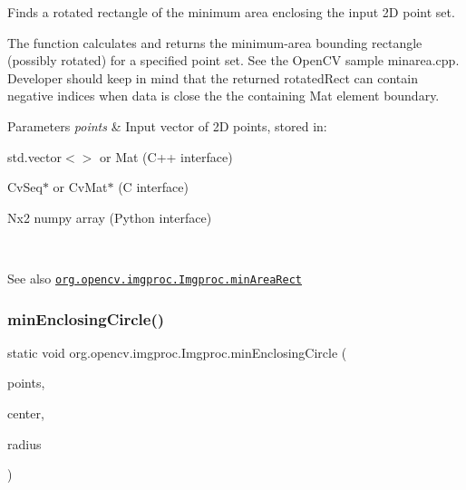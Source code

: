 Finds a rotated rectangle of the minimum area enclosing the input 2D point set.

The function calculates and returns the minimum-\/area bounding rectangle (possibly rotated) for a specified point set. See the Open\+CV sample {\ttfamily minarea.\+cpp}. Developer should keep in mind that the returned rotated\+Rect can contain negative indices when data is close the the containing Mat element boundary.


\begin{DoxyParams}{Parameters}
{\em points} & Input vector of 2D points, stored in\+: 
\begin{DoxyItemize}
\item {\ttfamily std.\+vector$<$$>$} or {\ttfamily Mat} (C++ interface) 
\item {\ttfamily Cv\+Seq$\ast$} or {\ttfamily Cv\+Mat$\ast$} (C interface) 
\item Nx2 numpy array (Python interface) 
\end{DoxyItemize}\\
\hline
\end{DoxyParams}
\begin{DoxySeeAlso}{See also}
\href{http://docs.opencv.org/modules/imgproc/doc/structural_analysis_and_shape_descriptors.html#minarearect}{\tt org.\+opencv.\+imgproc.\+Imgproc.\+min\+Area\+Rect} 
\end{DoxySeeAlso}
\mbox{\label{classorg_1_1opencv_1_1imgproc_1_1_imgproc_ac3ca3753976cf3f969df4b25a3f5ef78}} 
\subsubsection{\texorpdfstring{min\+Enclosing\+Circle()}{minEnclosingCircle()}}
{\footnotesize\ttfamily static void org.\+opencv.\+imgproc.\+Imgproc.\+min\+Enclosing\+Circle (\begin{DoxyParamCaption}\item[{\mbox{\hyperlink{classorg_1_1opencv_1_1core_1_1_mat_of_point2f}{Mat\+Of\+Point2f}}}]{points,  }\item[{\mbox{\hyperlink{classorg_1_1opencv_1_1core_1_1_point}{Point}}}]{center,  }\item[{float \mbox{[}$\,$\mbox{]}}]{radius }\end{DoxyParamCaption})\hspace{0.3cm}{\ttfamily [static]}}

